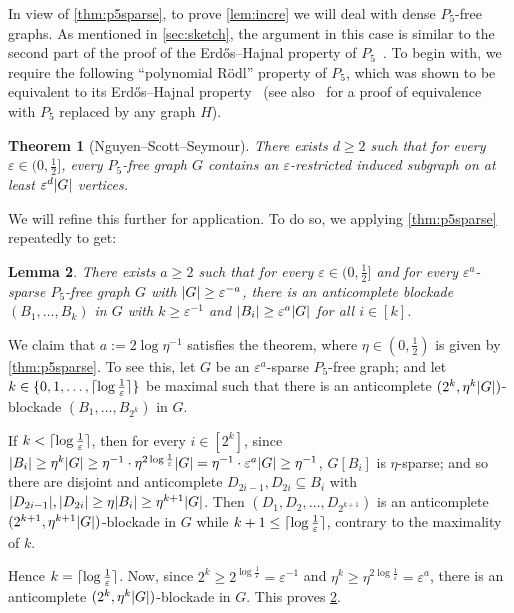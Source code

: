 \documentclass[11pt,reqno]{amsart}
\newtheorem{theorem}{Theorem}[section]
\newtheorem{lemma}[theorem]{Lemma}
\let\oldendproof\endproof
\renewenvironment{proof}[1][\proofname]{%
	\oldproof[\normalfont\bfseries #1]%
}{\oldendproof}
\newcommand{\dd}{\textquotedblleft}
\newcommand{\ee}{\textquotedblright}
\newcommand{\eps}{\varepsilon}
\renewcommand{\subset}{\subseteq}
\newcommand{\erh}{Erd\H{o}s--Hajnal}
\DeclarePairedDelimiter\abs{\lvert}{\rvert}%
\DeclarePairedDelimiter\ceil{\lceil}{\rceil}%
\begin{document}
	In view of \cref{thm:p5sparse}, to prove \cref{lem:incre} we will deal with dense $P_5$-free graphs.
	As mentioned in \cref{sec:sketch}, the argument in this case is similar to the second part of the proof of the \erh{} property of $P_5$~\cite[Section  7]{density7}.
	To begin with, we require the following \dd polynomial R\"odl\ee{} property of $P_5$, which was shown to be equivalent to its \erh{} property~\cite{density7} (see also~\cite{bfp2024} for a proof of equivalence with $P_5$ replaced by any graph $H$).
	\begin{theorem}
		[Nguyen--Scott--Seymour]
		\label{thm:p5rodl}
		There exists $d\ge2$ such that for every $\eps\in(0,\frac12]$, every $P_5$-free graph $G$ contains an $\eps$-restricted induced subgraph on at least $\eps^d\abs G$ vertices.
	\end{theorem}
	We will refine this further for application. To do so, we applying \cref{thm:p5sparse} repeatedly to get:
	\begin{lemma}
		\label{thm:sparsep5}
		There exists $a\ge2$ such that for every $\eps\in(0,\frac12]$ and for
		every $\eps^a$-sparse $P_5$-free graph $G$ with $\abs G\ge\eps^{-a}$,
		there is an anticomplete blockade $(B_1,\ldots,B_k)$ in $G$ with $k\ge\eps^{-1}$ and $\abs{B_i}\ge\eps^a\abs G$ for all $i\in[k]$.
	\end{lemma}
	\begin{proof}
		We claim that $a:=2\log\eta^{-1}$ satisfies the theorem,
		where $\eta\in(0,\frac12)$ is given by \cref{thm:p5sparse}.
		To see this, let $G$ be an $\eps^a$-sparse $P_5$-free graph;
		and let $k\in\{0,1,\ldots,\ceil{\log\frac1\eps}\}$ be maximal such that there is an anticomplete $(2^k,\eta^{k}\abs G)$-blockade $(B_1,\ldots,B_{2^k})$ in $G$.
		
		If $k<\ceil{\log\frac1\eps}$, then
		for every $i\in[2^k]$, since 
		$\abs{B_i}\ge \eta^k\abs G\ge \eta^{-1} \cdot\eta^{2\log\frac1\eps}\abs G=\eta^{-1}\cdot \eps^a\abs G\ge\eta^{-1}$,
		$G[B_i]$ is $\eta$-sparse;
		and so there are disjoint and anticomplete $D_{2i-1},D_{2i}\subset B_i$ with $\abs{D_{2i-1}},\abs{D_{2i}}\ge \eta\abs{B_i}\ge \eta^{k+1}\abs G$.
		Then $(D_1,D_2,\ldots,D_{2^{k+1}})$ is an anticomplete $(2^{k+1},\eta^{k+1}\abs G)$-blockade in $G$ while $k+1\le\ceil{\log\frac1\eps}$,
		contrary to the maximality of $k$.
		
		Hence $k=\ceil{\log\frac1\eps}$.
		Now, since $2^k\ge 2^{\log\frac1\eps}=\eps^{-1}$
		and $\eta^k\ge\eta^{2\log\frac1\eps}=\eps^a$,
		there is an anticomplete $(2^k,\eta^k\abs G)$-blockade in $G$.
		This proves \cref{thm:sparsep5}.
	\end{proof}
\end{document}
